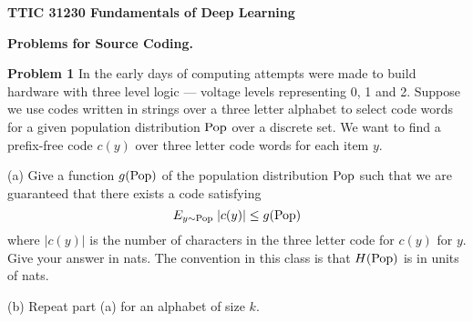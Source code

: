 \documentclass{article}
\newcommand{\solution}[1]{}
\begin{document}
\centerline{\bf TTIC 31230 Fundamentals of Deep Learning}

\bigskip

\centerline{\bf Problems for Source Coding.}

\bigskip
\bigskip

{\bf Problem 1}
In the early days of computing attempts were made to build hardware with three level logic --- voltage levels representing
0, 1 and 2.  Suppose we use codes written in strings over a three letter alphabet to select code words for a given population
distribution $\mathrm{Pop}$ over a discrete set.  We want to find a prefix-free code $c(y)$ over three letter code words
for each item $y$.

\medskip
(a) Give a function $g(\mathrm{Pop})$ of the population distribution $\mathrm{Pop}$ such that we are guaranteed
that there exists a code satisfying
$$E_{y \sim \mathrm{Pop}}\;|c(y)| \leq g(\mathrm{Pop})$$
where $|c(y)|$ is the number of characters in the three letter code for $c(y)$ for $y$.
Give your answer in nats.  The convention in this class is that $H(\mathrm{Pop})$ is in units of nats.


\solution{
  $$E_{y \sim \pop}\;|y| \leq \frac{H(\pop)}{\ln 3} + 1$$
}

\medskip
(b) Repeat part (a) for an alphabet of size $k$.

\solution{
  $$E_{y \sim \pop}\;|y| \leq \frac{H(\pop)}{\ln k} + 1$$
}
\end{document}
